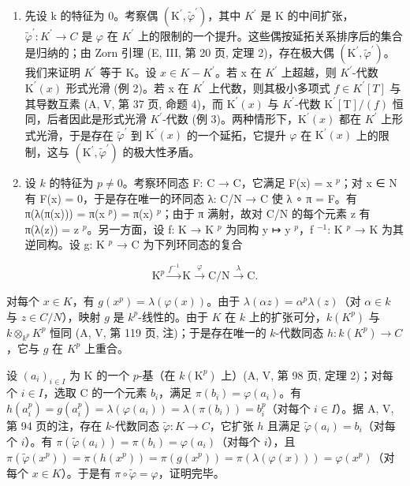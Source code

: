 \begin{enumerate}
\def\labelenumi{\Alph{enumi})}
\item
  先设 k 的特征为 0。考察偶 \((\mathrm{K}^{\prime}, \tilde{\varphi}^{\prime})\)，其中 \(K^{\prime}\) 是 K 的中间扩张，\(\tilde{\varphi}^{\prime}: K^{\prime} \to C\) 是 \(\varphi\) 在 \(K^{\prime}\) 上的限制的一个提升。这些偶按延拓关系排序后的集合是归纳的；由 Zorn 引理 (E, III, 第 20 页, 定理 2)，存在极大偶 \((\mathrm{K}^{\prime}, \tilde{\varphi}^{\prime})\)。我们来证明 \(K^{\prime}\) 等于 K。设 \(x \in K - K^{\prime}\)。若 x 在 \(K^{\prime}\) 上超越，则 \(K^{\prime}\)-代数 \(\mathrm{K}^{\prime}(x)\) 形式光滑 (例 2)。若 x 在 \(K^{\prime}\) 上代数，则其极小多项式 \(f \in K^{\prime}[T]\) 与其导数互素 (A, V, 第 37 页, 命题 4)，而 \(\mathrm{K}^{\prime}(x)\) 与 \(K^{\prime}\)-代数 \(\mathrm{K}^{\prime}[\mathrm{T}]/(f)\) 恒同，后者因此是形式光滑 \(K^{\prime}\)-代数 (例 3)。两种情形下，\(\mathrm{K}^{\prime}(x)\) 都在 \(K^{\prime}\) 上形式光滑，于是存在 \(\tilde{\varphi}^{\prime}\) 到 \(\mathrm{K}^{\prime}(x)\) 的一个延拓，它提升 \(\varphi\) 在 \(\mathrm{K}^{\prime}(x)\) 上的限制，这与 \((\mathrm{K}^{\prime}, \tilde{\varphi}^{\prime})\) 的极大性矛盾。
\item
  设 \(k\) 的特征为 \(p \neq 0\)。考察环同态 F: C → C，它满足 F(x) = x \(^{p}\)；对 x ∈ N 有 F(x) = 0，于是存在唯一的环同态 λ: C/N → C 使 λ ∘ π = F。有 π(λ(π(x))) = π(x \(^{p}\)) = π(x) \(^{p}\)；由于 π 满射，故对 C/N 的每个元素 z 有 π(λ(z)) = z \(^{p}\)。另一方面，设 f: K → K \(^{p}\) 为同构 y ↦ y \(^{p}\)，f \(^{-1}\): K \(^{p}\) → K 为其逆同构。设 g: K \(^{p}\) → C 为下列环同态的复合
\end{enumerate}

\[
\mathrm{K} ^ {p} \xrightarrow {f ^ {- 1}} \mathrm{K} \xrightarrow {\varphi} \mathrm{C} / \mathrm{N} \xrightarrow {\lambda} \mathrm{C}.
\]

对每个 \(x \in K\)，有 \(g(x^{p}) = \lambda(\varphi(x))\)。由于 \(\lambda(\alpha z) = \alpha^{p}\lambda(z)\)（对 \(\alpha \in k\) 与 \(z \in C/N\)），映射 \(g\) 是 \(k^{p}\)-线性的。由于 \(K\) 在 \(k\) 上的扩张可分，\(k(K^{p})\) 与 \(k \otimes_{k^{p}} K^{p}\) 恒同 (A, V, 第 119 页, 注)；于是存在唯一的 \(k\)-代数同态 \(h: k(K^{p}) \to C\)，它与 \(g\) 在 \(K^{p}\) 上重合。

设 \((a_{i})_{i\in I}\) 为 K 的一个 \(p\)-基（在 \(k(\mathrm{K}^p)\) 上）(A, V, 第 98 页, 定理 2)；对每个 \(i\in I\)，选取 C 的一个元素 \(b_{i}\)，满足 \(\pi(b_{i})=\varphi(a_{i})\)。有 \(h(a_{i}^{p})=g(a_{i}^{p})=\lambda(\varphi(a_{i}))=\lambda(\pi(b_{i}))=b_{i}^{p}\)（对每个 \(i\in I\)）。据 A, V, 第 94 页的注，存在 \(k\)-代数同态 \(\tilde{\varphi}:K\to C\)，它扩张 \(h\) 且满足 \(\tilde{\varphi}(a_{i})=b_{i}\)（对每个 \(i\)）。有 \(\pi(\tilde{\varphi}(a_{i}))=\pi(b_{i})=\varphi(a_{i})\)（对每个 \(i\)），且 \(\pi(\tilde{\varphi}(x^{p}))=\pi(h(x^{p}))=\pi(g(x^{p}))=\pi(\lambda(\varphi(x)))=\varphi(x^{p})\)（对每个 \(x\in K\)）。于是有 \(\pi\circ\tilde{\varphi}=\varphi\)，证明完毕。

